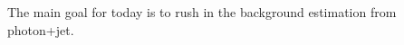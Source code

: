 

The main goal for today is to rush in the background estimation from photon+jet.

\begin{enumerate}
\end{enumerate}











